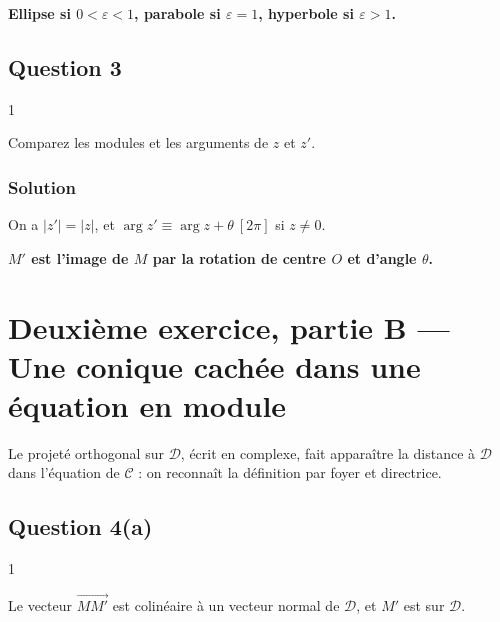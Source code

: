 \documentclass[11pt,a4paper]{article}
\begin{document}
\textbf{Ellipse si \(0<\varepsilon<1\), parabole si \(\varepsilon=1\), hyperbole si \(\varepsilon>1\).}

\hypertarget{question-3-1}{%
\subsection{Question 3}\label{question-3-1}}

\begin{indication}{1}

Comparez les modules et les arguments de \(z\) et \(z'\).

\end{indication}

\hypertarget{solution-19}{%
\subsubsection{Solution}\label{solution-19}}

On a \(|z'|=|z|\), et \(\arg z'\equiv\arg z+\theta\ [2\pi]\) si \(z\neq0\).

\textbf{\(M'\) est l'image de \(M\) par la rotation de centre \(O\) et d'angle \(\theta\).}

\hypertarget{deuxiuxe8me-exercice-partie-b-une-conique-cachuxe9e-dans-une-uxe9quation-en-module}{%
\section{Deuxième exercice, partie B --- Une conique cachée dans une équation en module}\label{deuxiuxe8me-exercice-partie-b-une-conique-cachuxe9e-dans-une-uxe9quation-en-module}}

Le projeté orthogonal sur \(\mathcal{D}\), écrit en complexe, fait apparaître la distance à \(\mathcal{D}\) dans l'équation de \(\mathcal{C}\) : on reconnaît la définition par foyer et directrice.

\hypertarget{question-4a}{%
\subsection{Question 4(a)}\label{question-4a}}

\begin{indication}{1}

Le vecteur \(\overrightarrow{MM'}\) est colinéaire à un vecteur normal de \(\mathcal{D}\), et \(M'\) est sur \(\mathcal{D}\).

\end{indication}
\end{document}
